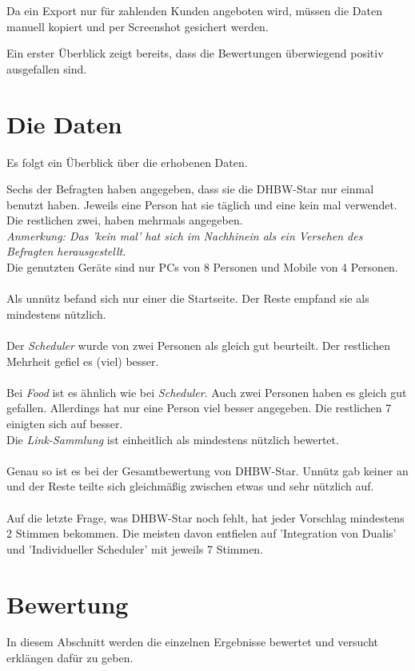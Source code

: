 Da ein Export nur für zahlenden Kunden angeboten wird, müssen die Daten manuell kopiert und per Screenshot gesichert werden.

Ein erster Überblick zeigt bereits, dass die Bewertungen überwiegend positiv ausgefallen sind.
\newpage
\section{Die Daten }
Es folgt ein Überblick über die erhobenen Daten.

Sechs der Befragten haben angegeben, dass sie die DHBW-Star nur einmal benutzt haben.
Jeweils eine Person hat sie täglich und eine kein mal verwendet.
Die restlichen zwei, haben mehrmals angegeben. \\
\emph{Anmerkung: Das 'kein mal' hat sich im Nachhinein als ein Versehen des Befragten herausgestellt. }
\\
Die genutzten Geräte sind nur PCs von 8 Personen und Mobile von 4 Personen. \\
\\
Als unnütz befand sich nur einer die Startseite. Der Reste empfand sie als mindestens nützlich. \\
\\
Der \emph{Scheduler} wurde von zwei Personen als gleich gut beurteilt. Der restlichen Mehrheit gefiel es (viel) besser. \\
\\
Bei \emph{Food} ist es ähnlich wie bei \emph{Scheduler}. Auch zwei Personen haben es gleich gut gefallen. Allerdings hat nur eine Person viel besser angegeben. Die restlichen 7 einigten sich auf besser.
\\
Die \emph{Link-Sammlung} ist einheitlich als mindestens nützlich bewertet. \\
\\
Genau so ist es bei der Gesamtbewertung von DHBW-Star. Unnütz gab keiner an und der Reste teilte sich gleichmäßig zwischen etwas und sehr nützlich auf. \\
\\
Auf die letzte Frage, was DHBW-Star noch fehlt, hat jeder Vorschlag mindestens 2 Stimmen bekommen. Die meisten davon entfielen auf 'Integration von Dualis' und 'Individueller Scheduler' mit jeweils 7 Stimmen.
\newpage
\section{Bewertung}
In diesem Abschnitt werden die einzelnen Ergebnisse bewertet und versucht erklängen dafür zu geben.

